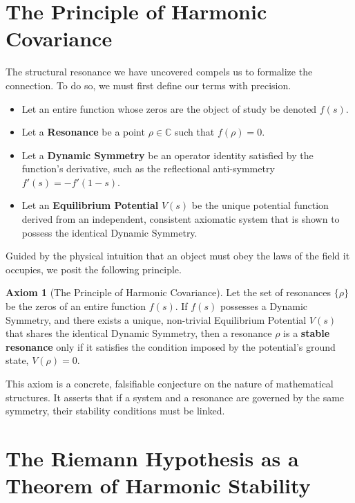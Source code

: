 \documentclass{article}
\theoremstyle{plain}
\theoremstyle{definition}
\newtheorem{axiom}[theorem]{Axiom}
\theoremstyle{remark}
\begin{document}
\section{The Principle of Harmonic Covariance}
\label{sec:covariance}

The structural resonance we have uncovered compels us to formalize the connection. To do so, we must first define our terms with precision.

\begin{itemize}
    \item Let an entire function whose zeros are the object of study be denoted $f(s)$.
    \item Let a \textbf{Resonance} be a point $\rho \in \mathbb{C}$ such that $f(\rho)=0$.
    \item Let a \textbf{Dynamic Symmetry} be an operator identity satisfied by the function's derivative, such as the reflectional anti-symmetry $f'(s) = -f'(1-s)$.
    \item Let an \textbf{Equilibrium Potential} $V(s)$ be the unique potential function derived from an independent, consistent axiomatic system that is shown to possess the identical Dynamic Symmetry.
\end{itemize}

Guided by the physical intuition that an object must obey the laws of the field it occupies, we posit the following principle.

\begin{axiom}[The Principle of Harmonic Covariance]
\label{ax:covariance}
Let the set of resonances $\{\rho\}$ be the zeros of an entire function $f(s)$. If $f(s)$ possesses a Dynamic Symmetry, and there exists a unique, non-trivial Equilibrium Potential $V(s)$ that shares the identical Dynamic Symmetry, then a resonance $\rho$ is a \textbf{stable resonance} only if it satisfies the condition imposed by the potential's ground state, $V(\rho)=0$.
\end{axiom}

This axiom is a concrete, falsifiable conjecture on the nature of mathematical structures. It asserts that if a system and a resonance are governed by the same symmetry, their stability conditions must be linked.

\section{The Riemann Hypothesis as a Theorem of Harmonic Stability}
\label{sec:proof}
\end{document}
